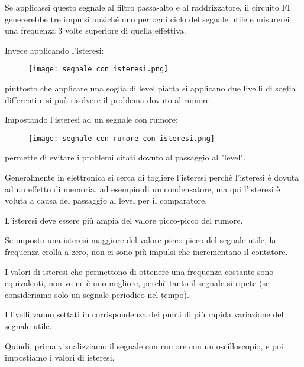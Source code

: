 Se applicassi questo segnale al filtro passa-alto e al raddrizzatore, 
il circuito FI genererebbe tre impulsi anziché uno per ogni ciclo del segnale utile 
e misurerei una frequenza 3 volte superiore di quella effettiva. \newline 

Invece applicando l'isteresi: 

\begin{figure}[h]
    \centering
    \texttt{[image: segnale con isteresi.png]}
\end{figure}

piuttosto che applicare una soglia di level piatta si applicano 
due livelli di soglia differenti e si può risolvere il problema dovuto al rumore. \newline 

Impostando l'isteresi ad un segnale con rumore: 

\begin{figure}[h]
    \centering
    \texttt{[image: segnale con rumore con isteresi.png]}
\end{figure}

permette di evitare i problemi citati dovuto al passaggio al "level". \newline 

Generalmente in elettronica si cerca di togliere l'isteresi perchè l'isteresi è dovuta ad un effetto di memoria, 
ad esempio di un condensatore, ma qui l'isteresi è voluta a causa del passaggio al level per il comparatore. \newline 

L'isteresi deve essere più ampia del valore picco-picco del rumore. \newline 

Se imposto una isteresi maggiore del valore picco-picco del segnale utile, la frequenza crolla a zero, non ci sono più impulsi che incrementano il contatore. \newline 

I valori di isteresi che permettono di ottenere una frequenza costante sono equivalenti, non ve ne è uno migliore, 
perchè tanto il segnale si ripete (se consideriamo solo un segnale periodico nel tempo). \newline 

I livelli vanno settati in corrispondenza dei punti di più rapida variazione del segnale utile. \newline 

Quindi, prima visualizziamo il segnale con rumore con un oscilloscopio, e poi impostiamo i valori di isteresi. \newline 

